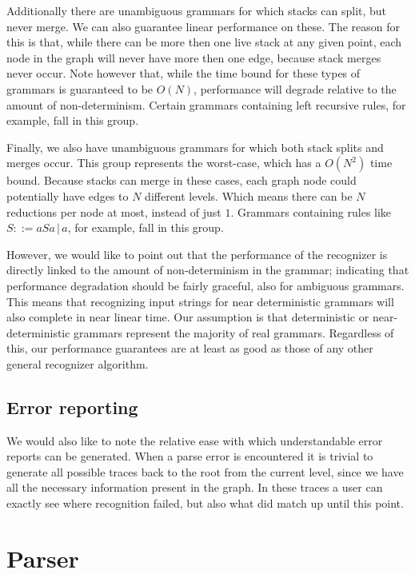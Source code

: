 \documentclass[a4paper,10pt]{article}
\begin{document}
Additionally there are unambiguous grammars for which stacks can split, but never merge. We can also guarantee linear performance on these. The reason for this is that, while there can be more then one live stack at any given point, each node in the graph will never have more then one edge, because stack merges never occur. Note however that, while the time bound for these types of grammars is guaranteed to be $O(N)$, performance will degrade relative to the amount of non-determinism. Certain grammars containing left recursive rules, for example, fall in this group.

Finally, we also have unambiguous grammars for which both stack splits and merges occur. This group represents the worst-case, which has a $O(N^2)$ time bound. Because stacks can merge in these cases, each graph node could potentially have edges to $N$ different levels. Which means there can be $N$ reductions per node at most, instead of just $1$. Grammars containing rules like $S ::= aSa\,|\,a$, for example, fall in this group.

However, we would like to point out that the performance of the recognizer is directly linked to the amount of non-determinism in the grammar; indicating that performance degradation should be fairly graceful, also for ambiguous grammars. This means that recognizing input strings for near deterministic grammars will also complete in near linear time. Our assumption is that deterministic or near-deterministic grammars represent the majority of real grammars. Regardless of this, our performance guarantees are at least as good as those of any other general recognizer algorithm.

\subsection{Error reporting}

We would also like to note the relative ease with which understandable error reports can be generated. When a parse error is encountered it is trivial to generate all possible traces back to the root from the current level, since we have all the necessary information present in the graph. In these traces a user can exactly see where recognition failed, but also what did match up until this point.

\section{Parser}
\end{document}
